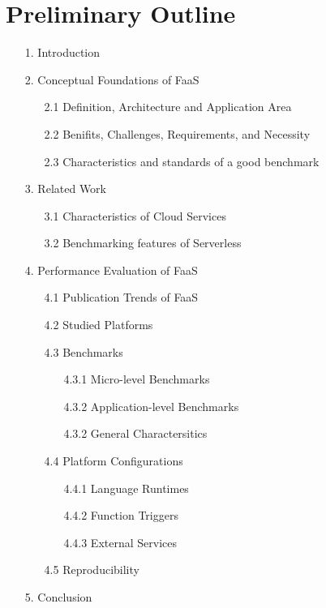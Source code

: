 \section{Preliminary Outline}
\label{sec:preliminary-outline}
\begin{enumerate}
\item[1.] Introduction
\item [2.] Conceptual Foundations of FaaS
\begin{enumerate}
\item[2.1] Definition, Architecture and Application Area
\item[2.2] Benifits, Challenges, Requirements, and Necessity
\item[2.3] Characteristics and standards of a good benchmark
\end{enumerate}
\item[3. ] Related Work
\begin{enumerate}
\item[3.1] Characteristics of Cloud Services
\item[3.2] Benchmarking features of Serverless
\end{enumerate}
\item[4. ] Performance Evaluation of FaaS
\begin{enumerate}
\item[4.1] Publication Trends of FaaS
\item[4.2] Studied Platforms
\item[4.3] Benchmarks
\begin{enumerate}
\item[4.3.1] Micro-level Benchmarks
\item[4.3.2] Application-level Benchmarks
\item[4.3.2] General Charactersitics
\end{enumerate}
\item[4.4] Platform Configurations
\begin{enumerate}
\item[4.4.1] Language Runtimes
\item[4.4.2] Function Triggers
\item[4.4.3] External Services
\end{enumerate}
\item[4.5] Reproducibility
\end{enumerate}
\item[5. ] Conclusion
\end{enumerate}

%

%

